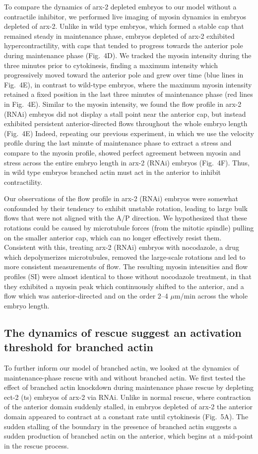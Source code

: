 \documentclass[11pt]{article}
\newcommand{\6}[1]{#1_{\text{6}}}
\newcommand{\3}[1]{#1_{\text{3}}}
\begin{document}
To compare the dynamics of arx-2 depleted embryos to our model without a contractile inhibitor, we performed live imaging of myosin dynamics in embryos depleted of arx-2. Unlike in wild type embryos, which formed a stable cap that remained steady in maintenance phase, embryos depleted of arx-2 exhibited hypercontractility, with caps that tended to progress towards the anterior pole during maintenance phase (Fig.\ 4D). We tracked the myosin intensity during the three minutes prior to cytokinesis, finding a maximum intensity which progressively moved toward the anterior pole and grew over time (blue lines in Fig.\ 4E), in contrast to wild-type embryos, where the maximum myosin intensity retained a fixed position in the last three minutes of maintenance phase (red lines in Fig.\ 4E). Similar to the myosin intensity, we found the flow profile in arx-2 (RNAi) embryos did not display a stall point near the anterior cap, but instead exhibited persistent anterior-directed flows throughout the whole embryo length (Fig.\ 4E) Indeed, repeating our previous experiment, in which we use the velocity profile during the last minute of maintenance phase to extract a stress and compare to the myosin profile, showed perfect agreement between myosin and stress across the entire embryo length in arx-2 (RNAi) embryos (Fig.\ 4F). Thus, in wild type embryos branched actin must act in the anterior to inhibit contractility.

Our observations of the flow profile in arx-2 (RNAi) embryos were somewhat confounded by their tendency to exhibit unstable rotation, leading to large bulk flows that were not aligned with the A/P direction. We hypothesized that these rotations could be caused by microtubule forces (from the mitotic spindle) pulling on the smaller anterior cap, which can no longer effectively resist them. Consistent with this, treating arx-2 (RNAi) embryos with nocodazole, a drug which depolymerizes microtubules, removed the large-scale rotations and led to more consistent measurements of flow. The resulting myosin intensities and flow profiles (SI) were almost identical to those without nocodazole treatment, in that they exhibited a myosin peak which continuously shifted to the anterior, and a flow which was anterior-directed and on the order 2--4 $\mu$m/min across the whole embryo length.


\subsection*{The dynamics of rescue suggest an activation threshold for branched actin}
To further inform our model of branched actin, we looked at the dynamics of maintenance-phase rescue with and without branched actin. We first tested the effect of branched actin knockdown during maintenance phase rescue by depleting ect-2 (ts) embryos of arx-2 via RNAi. Unlike in normal rescue, where contraction of the anterior domain suddenly stalled, in embryos depleted of arx-2 the anterior domain appeared to contract at a constant rate until cytokinesis (Fig.\ 5A). The sudden stalling of the boundary in the presence of branched actin suggests a sudden production of branched actin on the anterior, which begins at a mid-point in the rescue process. 
\end{document}
